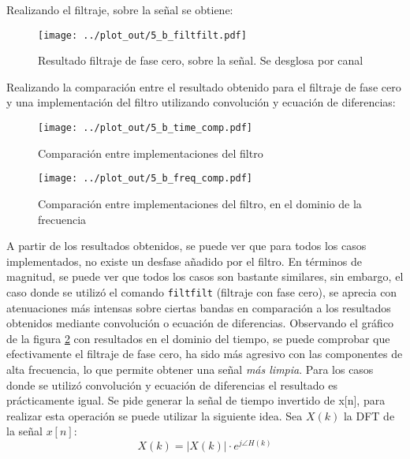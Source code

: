 		Realizando el filtraje, sobre la señal se obtiene:
		
		\begin{figure}[H]
			\center
			\texttt{[image: ../plot\_out/5\_b\_filtfilt.pdf]}
			\caption{Resultado filtraje de fase cero, sobre la señal. Se desglosa por canal}
			\label{fig:5_b_filtfilt}
		\end{figure}	
		
		Realizando la comparación entre el resultado obtenido para el filtraje de fase cero y una implementación del filtro utilizando convolución y ecuación de diferencias:
		
		\begin{figure}[H]
			\center
			\texttt{[image: ../plot\_out/5\_b\_time\_comp.pdf]}
			\caption{Comparación entre implementaciones del filtro}
			\label{fig:5_b_time_comp}
		\end{figure}	
		
		\begin{figure}[H]
			\center
			\texttt{[image: ../plot\_out/5\_b\_freq\_comp.pdf]}
			\caption{Comparación entre implementaciones del filtro, en el dominio de la frecuencia}
			\label{fig:5_b_freq_comp}
		\end{figure}
		
		A partir de los resultados obtenidos, se puede ver que para todos los casos implementados, no existe un desfase añadido por el filtro. En términos de magnitud, se puede ver que todos los casos son bastante similares, sin embargo, el caso donde se utilizó el comando \texttt{filtfilt} (filtraje con fase cero), se aprecia con atenuaciones más intensas sobre ciertas bandas en comparación a los resultados obtenidos mediante convolución o ecuación de diferencias. Observando el gráfico de la figura \ref{fig:5_b_time_comp} con resultados en el dominio del tiempo, se puede comprobar que efectivamente el filtraje de fase cero, ha sido más agresivo con las componentes de alta frecuencia, lo que permite obtener una señal \textit{más limpia}. Para los casos donde se utilizó convolución y ecuación de diferencias el resultado es prácticamente igual. Se pide generar la señal de tiempo invertido de x[n], para realizar esta operación se puede utilizar la siguiente idea. Sea $X(k)$ la \textsc{DFT} de la señal $x[n]$:
		\begin{equation}
			X(k) = |X(k)|  \cdot e^{j \angle H(k)}
		\end{equation}
		
